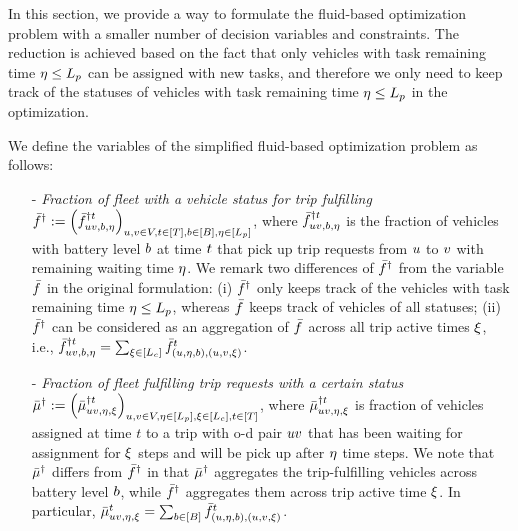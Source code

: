 In this section, we provide a way to formulate the fluid-based optimization problem with a smaller number of decision variables and constraints. The reduction is achieved based on the fact that only vehicles with task remaining time $\eta \leq L_p$ can be assigned with new tasks, and therefore we only need to keep track of the statuses of vehicles with task remaining time $\eta \leq L_p$ in the optimization.

We define the variables of the simplified fluid-based optimization problem as follows:
\begin{enumerate}
    \item[-] \emph{Fraction of fleet with a vehicle status for trip fulfilling $\bar{f}^{\dagger }_{} := \left(\bar{f}^{\dagger t}_{u v, b, \eta}\right)_{u,v \in V, t \in [T], b \in [B], \eta \in[L_p]}$}, where $\bar{f}^{\dagger t}_{u v, b, \eta}$ is the fraction of vehicles with battery level $b$ at time $t$ that pick up trip requests from $u$ to $v$ with remaining waiting time $\eta$. We remark two differences of $\bar{f}^{\dagger }_{}$ from the variable $\bar{f}^{}_{}$ in the original formulation: (i) $\bar{f}^{\dagger }_{}$ only keeps track of the vehicles with task remaining time $\eta \leq L_p$, whereas $\bar{f}^{}_{}$ keeps track of vehicles of all statuses; (ii) $\bar{f}^{\dagger }_{}$ can be considered as an aggregation of $\bar{f}^{}_{}$ across all trip active times $\xi$, i.e., $\bar{f}^{\dagger t}_{u v, b, \eta} = \sum_{\xi \in [L_c]} \bar{f}^{t}_{(u, \eta, b), (u, v, \xi)}$.
    \item[-] \emph{Fraction of fleet fulfilling trip requests with a certain status $\bar{\mu}^{\dagger }_{} := \left(\bar{\mu}^{\dagger t}_{u v, \eta, \xi}\right)_{u,v \in V, \eta \in [L_p], \xi \in [L_c], t \in [T]}$}, where $\bar{\mu}^{\dagger t}_{u v, \eta, \xi}$ is fraction of vehicles assigned at time $t$ to a trip with o-d pair $uv$ that has been waiting for assignment for $\xi$ steps and will be pick up after $\eta$ time steps. We note that $\bar{\mu}^{\dagger }_{}$ differs from $\bar{f}^{\dagger }_{}$ in that $\bar{\mu}^{\dagger }_{}$ aggregates the trip-fulfilling vehicles across battery level $b$, while $\bar{f}^{\dagger }_{}$ aggregates them across trip active time $\xi$. In particular, $\bar{\mu}^{t}_{u v, \eta, \xi} = \sum_{b \in [B]} \bar{f}^{t}_{(u, \eta, b), (u, v, \xi)}$.

\end{enumerate}
